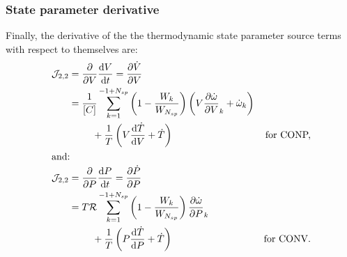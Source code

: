 \documentclass[12pt]{article}
\newcommand{\ns}{N_{sp}}
\newcommand{\conp}{CONP}
\newcommand{\conv}{CONV}
\newcommand{\dconp}{\ifmmode\text{for \conp,}\else for \conp,\fi}
\newcommand{\dconv}{\ifmmode\text{for \conv,}\else for \conv.\fi}
\newcommand{\Ru}{\mathcal{R}}
\begin{document}
\subsubsection{State parameter derivative}
Finally, the derivative of the the thermodynamic state parameter source terms with respect to themselves are:
\begin{align}
 \mathcal{J}_{2, 2} &= \frac{\partial }{\partial V } \frac{\text{d} V}{\text{d} t} = \frac{\partial \dot{V} }{\partial V} & \nonumber \\
		    &= \frac{1}{[C]} \sum_{k=1}^{-1 + \ns} \left(1 - \frac{W_{k}}{W_{\ns}}\right) \left(V \frac{\partial \dot{\omega} }{\partial V }_{k} + \dot{\omega}_{k}\right) \nonumber \\
		    & \mathindent + \frac{1}{T} \left(V \frac{\text{d} \dot{T} }{\text{d} V } + \dot{T}\right) & \text{\dconp} \\
 \intertext{and:}
 \mathcal{J}_{2, 2} &= \frac{\partial }{\partial P } \frac{\text{d} P}{\text{d} t} = \frac{\partial \dot{P} }{\partial P} & \nonumber \\
		    &= T \Ru \sum_{k=1}^{-1 + \ns} \left(1 - \frac{W_{k}}{W_{\ns}}\right) \frac{\partial \dot{\omega} }{\partial P }_{k} & \nonumber \\ 
		    & \mathindent + \frac{1}{T} \left(P \frac{\text{d} \dot{T} }{\text{d} P } + \dot{T}\right) & \text{\dconv}
\end{align}
\end{document}
